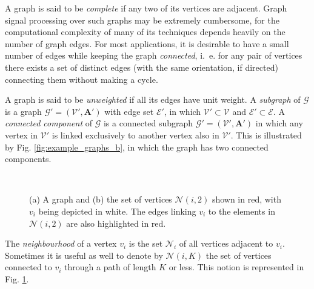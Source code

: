 A graph is said to be \emph{complete} if any two of its vertices are adjacent. Graph signal processing over such graphs may be extremely cumbersome, for the computational complexity of many of its techniques depends heavily on the number of graph edges. For most applications, it is desirable to have a small number of edges while keeping the graph \emph{connected}, i.~e. for any pair of vertices there exists a set of distinct edges (with the same orientation, if directed) connecting them without making a cycle.

A graph is said to be \emph{unweighted} if all its edges have unit weight. A \emph{subgraph} of $ \mathcal{G} $ is a graph $ \mathcal{G}' = (\mathcal{V}', \mathbf{A}')$ with edge set $ \mathcal{E}' $, in which $ \mathcal{V}' \subset \mathcal{V} $ and $ \mathcal{E}' \subset \mathcal{E} $. A \emph{connected component} of $ \mathcal{G} $ is a connected subgraph $ \mathcal{G}' = (\mathcal{V}', \mathbf{A}')$ in which any vertex in $ \mathcal{V}' $ is linked exclusively to another vertex also in $ \mathcal{V}' $. This is illustrated by Fig. \ref{fig:example_graphs_b}, in which the graph has two connected components.

\begin{figure}
	\centering
	~
	\caption{(a) A graph and (b) the set of vertices $ \mathcal{N}(i,2) $ shown in red, with $ v_i $ being depicted in white. The edges linking $ v_i $ to the elements in $ \mathcal{N}(i,2) $ are also highlighted in red.}%
	\label{fig:k_hop_neighborhood}%
\end{figure}

The \emph{neighbourhood} of a vertex $ v_i $ is the set $ \mathcal{N}_i $ of all vertices adjacent to $ v_i $. Sometimes it is useful as well to denote by $ \mathcal{N}(i,K) $ the set of vertices connected to $ v_i $ through a path of length $ K $ or less. This notion is represented in Fig. \ref{fig:k_hop_neighborhood}.

